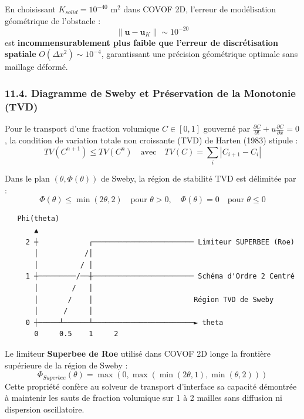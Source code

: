 \documentclass[
  french,
]{article}
\begin{document}
En choisissant \(K_{solid} = 10^{-40}\text{ m}^2\) dans COVOF 2D,
l'erreur de modélisation géométrique de l'obstacle :
\[\|\mathbf{u} - \mathbf{u}_K\| \sim 10^{-20}\] est
\textbf{incommensurablement plus faible que l'erreur de discrétisation
spatiale} \(O(\Delta x^2) \sim 10^{-4}\), garantissant une précision
géométrique optimale sans maillage déformé.

\subsubsection{11.4. Diagramme de Sweby et Préservation de la Monotonie
(TVD)}\label{diagramme-de-sweby-et-pruxe9servation-de-la-monotonie-tvd}

Pour le transport d'une fraction volumique \(C \in [0, 1]\) gouverné par
\(\frac{\partial C}{\partial t} + u \frac{\partial C}{\partial x} = 0\),
la condition de variation totale non croissante (TVD) de Harten (1983)
stipule :
\[TV(C^{n+1}) \le TV(C^n) \quad \text{avec} \quad TV(C) = \sum_i |C_{i+1} - C_i|\]

Dans le plan \((\theta, \Phi(\theta))\) de Sweby, la région de stabilité
TVD est délimitée par :
\[\Phi(\theta) \le \min(2\theta, 2) \quad \text{pour } \theta > 0, \quad \Phi(\theta) = 0 \quad \text{pour } \theta \le 0\]

\begin{verbatim}
   Phi(theta)
       ▲
     2 ┼            ┌──────────────────────── Limiteur SUPERBEE (Roe)
       │           /│
       │          / │
     1 ┼─────────/──┼──────────────────────── Schéma d'Ordre 2 Centré
       │        /   │
       │       /    │                        Région TVD de Sweby
       │      /     │
     0 ┼─────┴──────┴────────────────────────► theta
       0     0.5    1     2
\end{verbatim}

Le limiteur \textbf{Superbee de Roe} utilisé dans COVOF 2D longe la
frontière supérieure de la région de Sweby :
\[\Phi_{Superbee}(\theta) = \max \left( 0, \max(\min(2\theta, 1), \min(\theta, 2)) \right)\]
Cette propriété confère au solveur de transport d'interface sa capacité
démontrée à maintenir les sauts de fraction volumique sur 1 à 2 mailles
sans diffusion ni dispersion oscillatoire.
\end{document}
